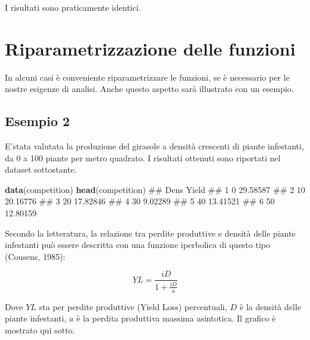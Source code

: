 \documentclass[a4paper,12pt,oneside]{book}
\newenvironment{Shaded}{\begin{snugshade}}{\end{snugshade}}
\newcommand{\KeywordTok}[1]{\textcolor[rgb]{0.13,0.29,0.53}{\textbf{#1}}}
\newcommand{\NormalTok}[1]{#1}
\theoremstyle{definition}
\theoremstyle{definition}
\theoremstyle{definition}
\theoremstyle{remark}
\begin{document}
I risultati sono praticamente identici.

\section{Riparametrizzazione delle
funzioni}\label{riparametrizzazione-delle-funzioni}

In alcuni casi è conveniente riparametrizzare le funzioni, se è
necessario per le nostre esigenze di analisi. Anche questo aspetto sarà
illustrato con un esempio.

\subsection{Esempio 2}\label{esempio-2-2}

E'stata valutata la produzione del girasole a densità crescenti di
piante infestanti, da 0 a 100 piante per metro quadrato. I risultati
ottenuti sono riportati nel dataset sottostante.

\begin{Shaded}
\begin{Highlighting}[]
\KeywordTok{data}\NormalTok{(competition)}
\KeywordTok{head}\NormalTok{(competition)}
\NormalTok{##   Dens    Yield}
\NormalTok{## 1    0 29.58587}
\NormalTok{## 2   10 20.16776}
\NormalTok{## 3   20 17.82846}
\NormalTok{## 4   30  9.02289}
\NormalTok{## 5   40 13.41521}
\NormalTok{## 6   50 12.80159}
\end{Highlighting}
\end{Shaded}

Secondo la letteratura, la relazione tra perdite produttive e densità
delle piante infestanti può essere descritta con una funzione iperbolica
di questo tipo (Cousens, 1985):

\[YL = \frac{iD}{1 + \frac{iD}{a}}\]

Dove \(YL\) sta per perdite produttive (Yield Loss) percentuali, \(D\) è
la densità delle piante infestanti, \(a\) è la perdita produttiva
massima asintotica. Il grafico è mostrato qui sotto.
\end{document}
